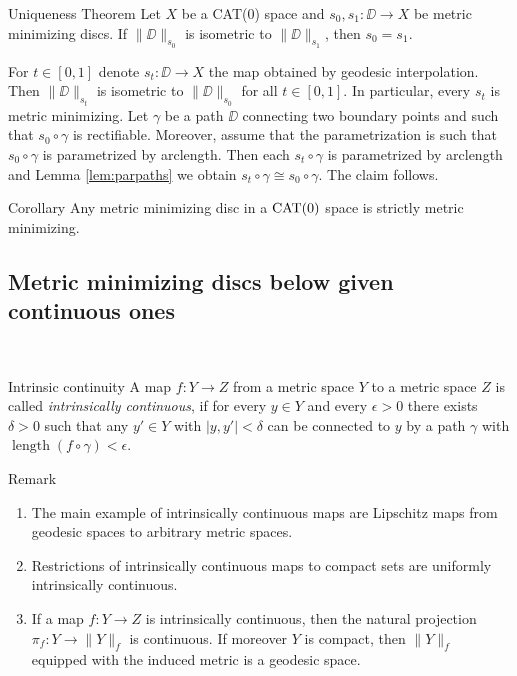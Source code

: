 \documentclass[a4paper,10pt]{amsart}
\begin{document}
\begin{thm}{Uniqueness Theorem}\label{prop:strict-mm}
Let $X$ be a CAT(0) space and $s_0, s_1:\DD\to X$ be metric minimizing discs. If 
$\|\DD\|_{s_0}$ is isometric to $\|\DD\|_{s_1}$, then $s_0=s_1$.
\end{thm}

For $t\in[0,1]$ denote $s_t:\DD\to X$ the map obtained by geodesic interpolation. Then
$\|\DD\|_{s_t}$ is isometric to $\|\DD\|_{s_0}$ for all $t\in[0,1]$. In particular, every $s_t$ is metric minimizing.
Let $\gamma$ be a path $\DD$ connecting two boundary points and such that $s_0\circ\gamma$ is rectifiable.
Moreover, assume that the parametrization is such that $s_0\circ\gamma$ is parametrized by arclength. Then each 
$s_t\circ\gamma$ is parametrized by arclength and Lemma \ref{lem:parpaths} we obtain $s_t\circ\gamma\cong s_0\circ\gamma$.
The claim follows.
\qeds



\begin{thm}{Corollary}\label{prop:strict-mm}
Any metric minimizing disc in a $\mathop{\rm CAT}\nolimits(0)$ space is strictly metric minimizing.
\end{thm}



\subsection{Metric minimizing discs below given continuous ones}~
\medskip
\begin{thm}{Intrinsic continuity}
A map $f:Y\to Z$ from a metric space $Y$ to a metric space
 $Z$ is called
{\em intrinsically continuous}, if for every $y\in Y$ 
and every $\epsilon>0$ there
exists $\delta>0$ such that any  $y'\in Y$
with $|y,y'|<\delta$ can be connected to $y$ by a path $\gamma$ 
with $\operatorname{length}(f\circ\gamma)<\epsilon$.
\end{thm}

\begin{thm}{Remark}
\begin{enumerate}
 \item The main example of intrinsically continuous maps are Lipschitz
maps from geodesic spaces to arbitrary metric spaces.
\item Restrictions of intrinsically continuous maps to compact sets are uniformly intrinsically continuous. 
\item If a map $f:Y\to Z$ is intrinsically continuous, then 
the natural projection $\pi_f:Y\rightarrow \|Y\|_f$ is continuous. If
moreover $Y$ is compact, then $\|Y\|_f$ equipped with the induced 
metric is a geodesic space.
\end{enumerate}
\end{thm}
\end{document}
